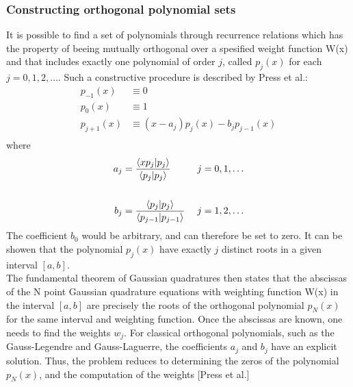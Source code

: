 \documentclass[%
reprint,
amsmath,amssymb,
aps,
]{revtex4-1}
\begin{document}
\subsubsection{Constructing orthogonal polynomial sets}
It is possible to find a set of polynomials through recurrence relations which has the property of beeing mutually orthogonal over a spesified weight function W(x) and that includes exactly one polynomial of order $j$, called $p_j(x)$ for each $j = 0,1,2,\dots$. Such a constructive procedure is described by Press et al.:
\begin{align*}
	p_{-1}(x) &\equiv 0\\
	p_{0}(x) &\equiv 1\\
	p_{j+1}(x) &\equiv (x-a_j)p_j(x)-b_jp_{j-1}(x)\\
\end{align*}
where
\begin{align*}
	a_j &= \dfrac{\braket{xp_j}{p_j}}{\braket{p_j}{p_j}} &\hspace{1mm} j = 0,1, \dots \\ &&\\
	b_j &=\dfrac{\braket{p_j}{p_j}}{\braket{p_{j-1}}{p_{j-1}}} &\hspace{1mm} j = 1,2, \dots
\end{align*}
The coefficient $b_0$ would be arbitrary, and can therefore be set to zero. It can be showen that the polynomial $p_j(x)$ have exactly $j$ distinct roots in a given interval $[a,b]$. \\
The fundamental theorem of Gaussian quadratures then states that the  abscissas of the N point Gaussian quadrature equations with weighting function W(x) in the interval $[a,b]$ are precisely the roots of the orthogonal polynomial $p_N(x)$ for the same interval and weighting function. Once the abscissas are known, one needs to find the weights $w_j$. For classical orthogonal polynomials, such as the Gauss-Legendre and Gauss-Laguerre, the coefficients $a_j$ and $b_j$ have an explicit solution. Thus, the problem reduces to determining the zeros of the polynomial $p_N(x)$, and the computation of the weights [Press et al.]\\
\end{document}
